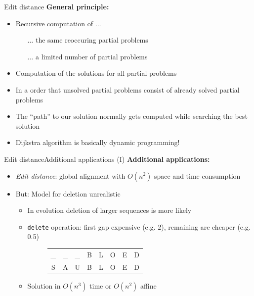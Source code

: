 \begin{frame}{Edit distance}
  \textbf{General principle:}
  \begin{itemize}
    \item<2->
      Recursive computation of $\ldots$
      \begin{itemize}
        \item[$\ldots$]
          the same reoccuring partial problems
        \item[$\ldots$]
          a limited number of partial problems
      \end{itemize}
    \item<3->
      Computation of the solutions for all partial problems
    \item<4->
      In a order that unsolved partial problems consist of already solved
      partial problems
    \item<5->
      The \enquote{path} to our solution normally gets computed while searching
      the best solution
    \item<5->
      Dijkstra algorithm is basically dynamic programming!
  \end{itemize}
\end{frame}


\begin{frame}{Edit distance}{Additional applications (I)}
  \textbf{Additional applications:}
  \begin{itemize}
    \item<2->
      \textit{Edit distance}: global alignment with $O(n^2)$ space and time
      consumption
    \item<3->
      But: Model for deletion unrealistic
      \begin{itemize}
        \item<4->
          In evolution deletion of larger sequences is more likely
        \item<5->
          \texttt{delete} operation: first gap expensive (e.g. 2),
          remaining are cheaper (e.g. 0.5)
          \begin{figure}[!h]
            \begin{tabular}{cccccccc}
              \_ & \_ & \_ & B & L & O & E & D\\
              S & A & U & B & L & O & E & D
            \end{tabular}
          \end{figure}
        \item<6->
          Solution in $O(n^3)$ time or $O(n^2)$ affine
      \end{itemize}
  \end{itemize}
\end{frame}

